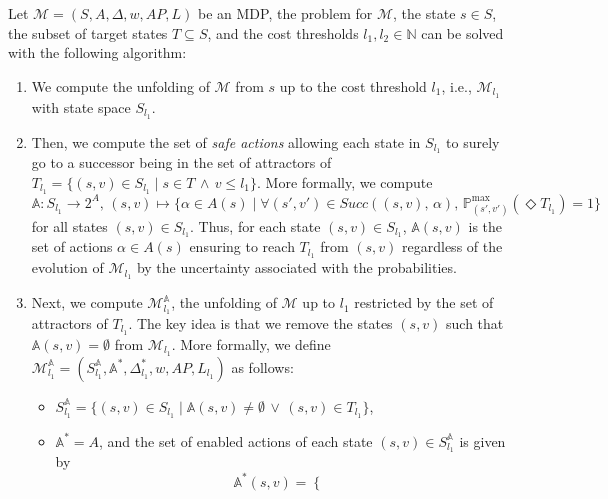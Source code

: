 Let $\mathcal{M}=(S, A, \Delta, w, AP, L)$ be an MDP, the \SSPWE{} problem for $\mathcal{M}$, the state $s \in S$, the subset of target states $T \subseteq S$, and the cost thresholds $l_1, l_2 \in \mathbb{N}$ can be solved with the following algorithm:
\begin{enumerate}
  \item We compute the unfolding of $\mathcal{M}$ from $s$ up to the cost threshold $l_1$, i.e., $\mathcal{M}_{l_1}$ with state space $S_{l_1}$.
  \item Then, we compute the set of \textit{safe actions} allowing each state in $S_{l_1}$ to surely go to a successor being in the set of attractors of
  $T_{l_1} = \{ (s, v) \in S_{l_1} \; | \; s \in T \, \wedge \, v \leq l_1 \}$.
  More formally, we compute \[\mathbb{A}: S_{l_1} \rightarrow 2^A, \, (s, v) \mapsto \{ \alpha \in A(s) \; | \; \forall (s', v') \in Succ((s, v), \, \alpha), \, \mathbb{P}^{\max}_{(s', v')}(\Diamond T_{l_1}) = 1 \}\]
  for all states $(s, v) \in S_{l_1}$. Thus, for each state $(s, v) \in S_{l_1}$, $\mathbb{A}(s, v)$
  is the set of actions $\alpha \in A(s)$ ensuring to reach $T_{l_1}$ from $(s, v)$ regardless of the evolution of $\mathcal{M}_{l_1}$ by the uncertainty associated with the probabilities.
  \item Next, we compute $\mathcal{M}^\mathbb{A}_{l_1}$, the unfolding of $\mathcal{M}$ up to $l_1$ restricted by the set of attractors of $T_{l_1}$. The key idea is that we remove the states $(s, v)$ such that $\mathbb{A}(s, v) = \emptyset$ from $\mathcal{M}_{l_1}$. More formally,
  we define $\mathcal{M}^\mathbb{A}_{l_1} = (S^\mathbb{A}_{l_1}, \mathbb{A}^*, \Delta^*_{l_1}, w, AP, L_{l_1})$ as follows:
  \begin{itemize}
    \item $S^\mathbb{A}_{l_1} = \{ (s, v) \in S_{l_1} \; | \; \mathbb{A}(s, v) \neq \emptyset \, \vee \, (s, v) \in T_{l_1} \}$,
    \item $\mathbb{A}^* = A$, and the set of enabled actions of each state $(s, v) \in S^\mathbb{A}_{l_1}$ is given by %
    \[
      \mathbb{A}^*(s, v) = \begin{cases}

\end{cases}\]
\end{itemize}
\end{enumerate}
